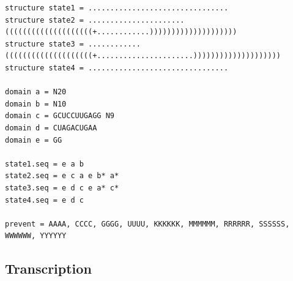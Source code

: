 \begin{lstlisting}[caption=Nupack code for the short translator, label=codelong]
structure state1 = ................................
structure state2 = ......................((((((((((((((((((((+............))))))))))))))))))))
structure state3 = ............((((((((((((((((((((+......................))))))))))))))))))))
structure state4 = ................................

domain a = N20
domain b = N10
domain c = GCUCCUUGAGG N9
domain d = CUAGACUGAA
domain e = GG

state1.seq = e a b
state2.seq = e c a e b* a*
state3.seq = e d c e a* c*
state4.seq = e d c

prevent = AAAA, CCCC, GGGG, UUUU, KKKKKK, MMMMMM, RRRRRR, SSSSSS, WWWWWW, YYYYYY
\end{lstlisting}



\subsection{Transcription}

